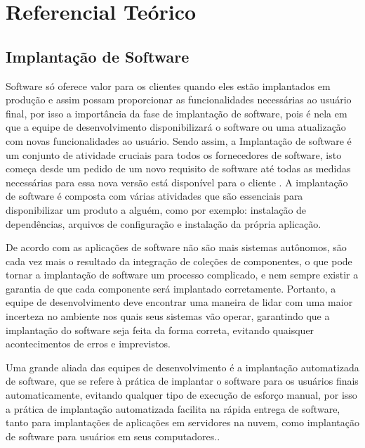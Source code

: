 \chapter{Referencial Teórico}
\label{cap-referencial}

\section{Implantação de Software}

Software só oferece valor para os clientes quando eles estão implantados em produção
e assim possam proporcionar as funcionalidades necessárias ao usuário final,
por isso a importância da fase de implantação de software, pois é nela em que a equipe
de desenvolvimento disponibilizará o software ou uma atualização com novas funcionalidades
ao usuário. Sendo assim, a Implantação de software é um conjunto de atividade cruciais
para todos os fornecedores de software, isto começa desde um pedido de um novo requisito
de software até todas as medidas necessárias para essa nova versão está disponível
para o cliente \cite{5741269}. A implantação de software é composta com várias
atividades que são essenciais para disponibilizar um produto a alguém, como por exemplo:
instalação de dependências, arquivos de configuração e instalação da própria aplicação.

De acordo com \cite{deployment1998} as aplicações de software não são mais
sistemas autônomos, são cada vez mais o resultado da integração de coleções de
componentes, o que pode tornar a implantação de software um processo complicado, e
nem sempre existir a garantia de que cada componente será implantado corretamente.
Portanto, a equipe de desenvolvimento deve encontrar uma maneira de lidar
com uma maior incerteza no ambiente nos quais seus sistemas vão operar, garantindo
que a implantação do software seja feita da forma correta, evitando quaisquer acontecimentos
de erros e imprevistos.

Uma grande aliada das equipes de desenvolvimento é a implantação automatizada de
software, que se refere à prática de implantar o software para os usuários finais
automaticamente, evitando qualquer tipo de execução de esforço manual, por isso
a prática de implantação automatizada facilita na rápida entrega de software, tanto
para implantações de aplicações em servidores na nuvem, como implantação de software
para usuários em seus computadores.\cite{7284592}.

